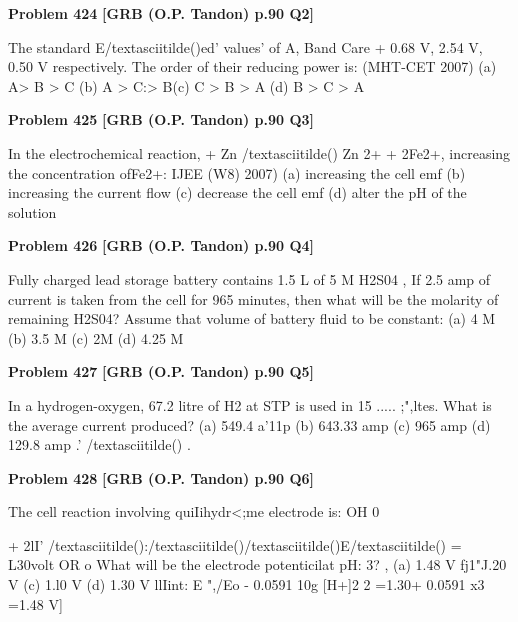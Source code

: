\begin{problembox}
\textbf{Problem 424} \hfill \textbf{[GRB (O.P. Tandon) p.90 Q2]}
\label{q:ext-grb_all_questions-424}

The standard E/textasciitilde()ed' values' of A, Band Care + 0.68 V, 
2.54 V, 
0.50 V respectively. The order of their reducing 
power is: 
(MHT-CET 2007) 
(a) A> B > C (b) A > C:> B(c) C > B > A (d) B > C > A
\end{problembox}

\begin{problembox}
\textbf{Problem 425} \hfill \textbf{[GRB (O.P. Tandon) p.90 Q3]}
\label{q:ext-grb_all_questions-425}

In the electrochemical reaction, 
+ Zn /textasciitilde() 
Zn 2+ + 2Fe2+, 
increasing the concentration ofFe2+: 
IJEE (W8) 2007) 
(a) increasing the cell emf 
(b) increasing the current flow 
(c) decrease the cell emf 
(d) alter the pH of the solution
\end{problembox}

\begin{problembox}
\textbf{Problem 426} \hfill \textbf{[GRB (O.P. Tandon) p.90 Q4]}
\label{q:ext-grb_all_questions-426}

Fully charged lead storage battery contains 1.5 L of 
5 M H2S04 , If 2.5 amp of current is taken from the cell for 
965 minutes, then what will be the molarity of remaining 
H2S04? Assume that volume of battery fluid to be constant: 
(a) 4 M 
(b) 3.5 M 
(c) 2M 
(d) 4.25 M
\end{problembox}

\begin{problembox}
\textbf{Problem 427} \hfill \textbf{[GRB (O.P. Tandon) p.90 Q5]}
\label{q:ext-grb_all_questions-427}

In a hydrogen-oxygen, 67.2 litre of H2 at STP is used in 
15 ..... ;",ltes. What is the average current produced? 
(a) 549.4 a'11p 
(b) 643.33 amp 
(c) 965 amp 
(d) 129.8 amp 
.' /textasciitilde() 
.
\end{problembox}

\begin{problembox}
\textbf{Problem 428} \hfill \textbf{[GRB (O.P. Tandon) p.90 Q6]}
\label{q:ext-grb_all_questions-428}

The cell reaction involving quiIihydr<;me electrode is: 
OH 
0 
    
+ 2lI' /textasciitilde():/textasciitilde()/textasciitilde()E/textasciitilde() = L30volt 
OR 
o 
What will be the electrode potenticilat pH: 3? , 
(a) 1.48 V 
fj1"J.20 V 
(c) 1.l0 V 
(d) 1.30 V 
llIint: 
E ",/Eo - 0.0591 10g [H+]2 
2 
=1.30+ 0.0591 x3 =1.48 V]
\end{problembox}

